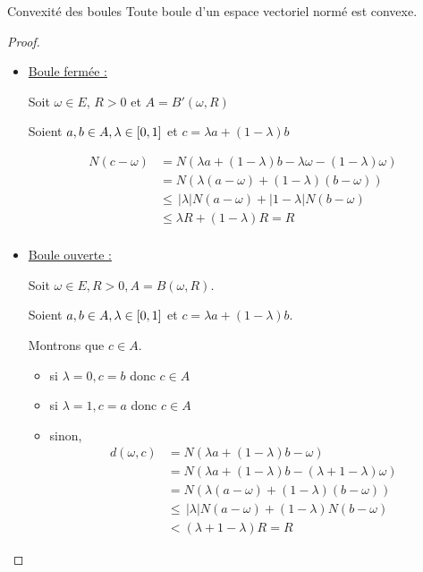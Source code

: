 \begin{proposition}{Convexité des boules}{}
    Toute boule d'un espace vectoriel normé est convexe. 
\end{proposition}



\begin{proof}~

    \begin{itemize}
        \item \uline{Boule fermée :}

        Soit $\omega \in E$, $R > 0$ et $A = B'( \omega, R)$
    
        Soient $a, b \in A, \lambda \in \left[0, 1\right]$ et $c = \lambda a + (1 - \lambda)b$

        \begin{align*}
            N(c - \omega) & = N(\lambda a + (1 - \lambda)b - \lambda \omega - (1 - \lambda) \omega) \\
            & = N(\lambda(a - \omega) + (1 - \lambda)(b - \omega)) \\
            & \leqslant \, |\lambda| N(a - \omega) + |1 - \lambda| N(b - \omega) \\
            & \leqslant \lambda R + (1 - \lambda)R = R \\
        \end{align*}

        \item \underline{Boule ouverte :}

        Soit $\omega  \in E, R > 0, A = B(\omega, R)$. 

        Soient $a, b \in A, \lambda \in \left[0, 1\right]$ et $c = \lambda a + (1 - \lambda)b$.

        Montrons que $c \in A$. 
        \begin{itemize}
            \item si $\lambda = 0, c = b$ donc $c \in A$
            \item si $\lambda = 1, c = a$ donc $c \in A$
            \item sinon, 
                \begin{align*}
                    d(\omega, c) & = N(\lambda a + (1 - \lambda) b - \omega) \\
                    & = N(\lambda a + (1 - \lambda) b - (\lambda + 1- \lambda) \omega) \\
                    & = N(\lambda(a - \omega) + (1 - \lambda) (b - \omega)) \\
                    & \leqslant \, |\lambda| N(a - \omega) + (1 - \lambda)N(b - \omega) \\
                    & < (\lambda + 1 - \lambda) R = R
                \end{align*}
        \end{itemize}
    \end{itemize}
\end{proof}

